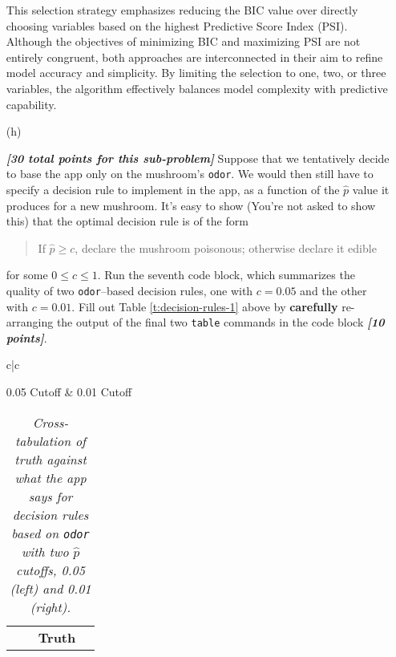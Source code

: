 \documentclass[12pt]{article}
\newcommand{\bi}[1]{\b{\i{#1}}}
\renewcommand{\b}[1]{\textbf{#1}}
\renewcommand{\i}[1]{\textit{#1}}
\begin{document}
\begin{itemize}
{This selection strategy emphasizes reducing the BIC value over directly choosing variables based on the highest Predictive Score Index (PSI). Although the objectives of minimizing BIC and maximizing PSI are not entirely congruent, both approaches are interconnected in their aim to refine model accuracy and simplicity. By limiting the selection to one, two, or three variables, the algorithm effectively balances model complexity with predictive capability.


}


\item[(h)]

\bi{[30 total points for this sub-problem]} Suppose that we tentatively decide to base the app only on the mushroom's \texttt{odor}. We would then still have to specify a decision rule to implement in the app, as a function of the $\hat{ p }$ value it produces for a new mushroom. It's easy to show (You're not asked to show this) that the optimal decision rule is of the form

\begin{quote}

If $\hat{ p } \ge c$, declare the mushroom poisonous; otherwise declare it edible

\end{quote}



for some $0 \le c \le 1$. Run the seventh code block, which summarizes the quality of two \texttt{odor}--based decision rules, one with $c = 0.05$ and the other with $c = 0.01$. Fill out Table \ref{t:decision-rules-1} above by \textbf{carefully} re-arranging the output of the final two \texttt{table} commands in the code block \bi{[10 points]}.

\begin{table}[t!]

\centering

\caption{\textit{Cross-tabulation of truth against what the app says for decision rules based on \texttt{odor} with two $\hat{ p }$ cutoffs, 0.05 (left) and 0.01 (right).}}

\bigskip

\begin{tabular}{c|c}

\textsf{0.05 Cutoff} & \textsf{0.01 Cutoff} \\ 

\begin{tabular}{cc|c|c|c}

& \multicolumn{1}{c}{} & \multicolumn{2}{c}{\textbf{Truth}} \\


\end{tabular}
\end{tabular}
\end{table}
\end{itemize}
\end{document}
